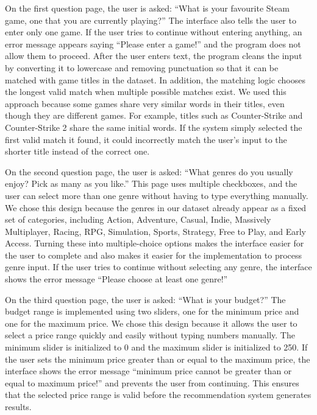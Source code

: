 \documentclass[fontsize=11pt]{article}
\begin{document}
On the first question page, the user is asked: ``What is your favourite Steam game, one that you are currently playing?'' The interface also tells the user to enter only one game. If the user tries to continue without entering anything, an error message appears saying ``Please enter a game!'' and the program does not allow them to proceed. After the user enters text, the program cleans the input by converting it to lowercase and removing punctuation so that it can be matched with game titles in the dataset. In addition, the matching logic chooses the longest valid match when multiple possible matches exist. We used this approach because some games share very similar words in their titles, even though they are different games. For example, titles such as Counter-Strike and Counter-Strike 2 share the same initial words. If the system simply selected the first valid match it found, it could incorrectly match the user’s input to the shorter title instead of the correct one.

On the second question page, the user is asked: ``What genres do you usually enjoy? Pick as many as you like.'' This page uses multiple checkboxes, and the user can select more than one genre without having to type everything manually. We chose this design because the genres in our dataset already appear as a fixed set of categories, including Action, Adventure, Casual, Indie, Massively Multiplayer, Racing, RPG, Simulation, Sports, Strategy, Free to Play, and Early Access. Turning these into multiple-choice options makes the interface easier for the user to complete and also makes it easier for the implementation to process genre input. If the user tries to continue without selecting any genre, the interface shows the error message ``Please choose at least one genre!''

On the third question page, the user is asked: ``What is your budget?'' The budget range is implemented using two sliders, one for the minimum price and one for the maximum price. We chose this design because it allows the user to select a price range quickly and easily without typing numbers manually. The minimum slider is initialized to 0 and the maximum slider is initialized to 250. If the user sets the minimum price greater than or equal to the maximum price, the interface shows the error message ``minimum price cannot be greater than or equal to maximum price!'' and prevents the user from continuing. This ensures that the selected price range is valid before the recommendation system generates results.
\end{document}

